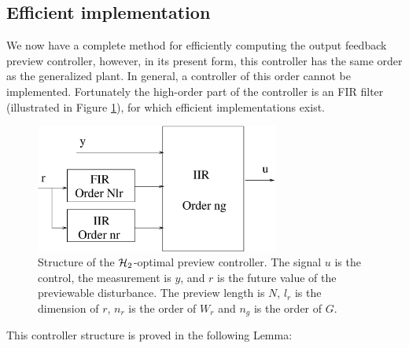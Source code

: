 \subsection{Efficient implementation}
\label{sec:EffImp}
We now have a complete method for efficiently computing the output feedback preview controller, however, in its present form, this controller has the same order as the generalized plant. In general, a controller of this order cannot be implemented. Fortunately the high-order part of the controller is an FIR filter (illustrated in Figure \ref{fig:PrevContStruct}), for which efficient implementations exist.
{
\stdcontrolfrags
{}
\begin{figure}
\begin{center}
\includegraphics[width=8cm]{./diags/PrevContStruct.eps}
\caption{\label{fig:PrevContStruct} Structure of the $\mathcal H_2$-optimal preview controller. The signal $u$ is the control, the measurement is $y$, and $r$ is the future value of the previewable disturbance. The preview length is $N$, $l_r$ is the dimension of $r$, $n_r$ is the order of $W_r$ and $n_g$ is the order of $G$. }
\end{center}
\end{figure}
}


This controller structure is proved in the following Lemma:


